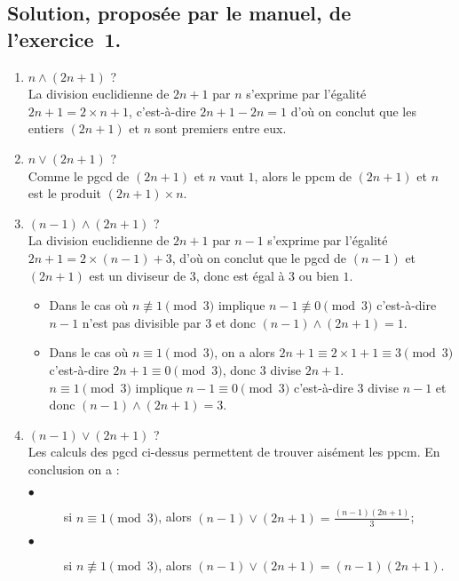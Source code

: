 \documentclass[a4paper,14pt]{extarticle} %
\begin{document}
\subsection*{Solution, proposée par le manuel, de l'exercice~1.}
\begin{enumerate}

\item $n \wedge (2n+1)$ ? \\
La division euclidienne de $2n+1$ par $n$ s'exprime par l'égalité $2n+1= 2\times n +1$, c'est-à-dire $2n+1-2n=1$ d'où on conclut que les entiers $(2n+1)$ et $n$ sont premiers entre eux.

\item $n \vee (2n+1)$ ?\\
Comme le pgcd de $(2n+1)$ et $n$ vaut $1$, alors le ppcm de $(2n+1)$ et $n$ est le produit $(2n+1) \times n$.

\item $(n-1)\wedge(2n+1)$ ? \\
La division euclidienne de $2n+1$ par $n-1$ s'exprime par l'égalité $2n+1= 2\times (n-1) +3 $,  d'où on conclut que le pgcd de $(n-1)$ et $(2n+1)$ est un diviseur de $3$, donc est égal à $3$ ou bien $1$.

\begin{itemize}

\item Dans le cas où $n \not\equiv 1 \pmod{3}$ 
 implique $n-1 \not\equiv 0 \pmod{3}$ c'est-à-dire $n-1$ n'est pas divisible par $3$  et donc $(n-1)\wedge(2n+1)=1$.
 
\item Dans le cas où $n \equiv 1 \pmod{3}$, on a alors $2n+1\equiv 2\times 1+1 \equiv 3  \pmod{3}$ c'est-à-dire $2n+1\equiv 0 \pmod{3}$, donc 3 divise $2n+1$.\\
$n \equiv 1 \pmod{3}$ implique $n-1 \equiv 0 \pmod{3}$ c'est-à-dire 3 divise $n-1$  et donc $(n-1)\wedge(2n+1)=3$.
\end{itemize}	


\item $(n-1)\vee(2n+1)$ ?\\
Les calculs des pgcd ci-dessus permettent de trouver aisément les ppcm. En conclusion on a :
\begin{description}
\item[$\bullet$] si $n \equiv 1 \pmod{3}$, alors $(n-1)\vee(2n+1) = \frac{(n-1)(2n+1)}{3} $;
\item[$\bullet$] si $n \not\equiv 1 \pmod{3}$, alors $(n-1)\vee(2n+1) = (n-1)(2n+1)$. 
\end{description}


\end{enumerate}
\end{document}
